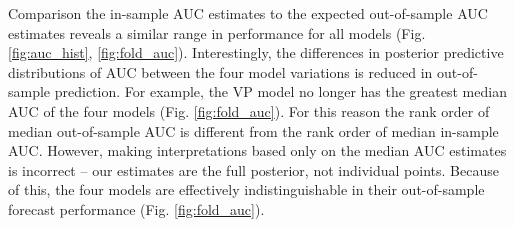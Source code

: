 \documentclass[12pt,letterpaper]{article}
\begin{document}
\begin{refsection}
Comparison the in-sample AUC estimates to the expected out-of-sample AUC estimates reveals a similar range in performance for all models (Fig. \ref{fig:auc_hist}, \ref{fig:fold_auc}). Interestingly, the differences in posterior predictive distributions of AUC between the four model variations is reduced in out-of-sample prediction. For example, the VP model no longer has the greatest median AUC of the four models (Fig. \ref{fig:fold_auc}). For this reason the rank order of median out-of-sample AUC is different from the rank order of median in-sample AUC. However, making interpretations based only on the median AUC estimates is incorrect -- our estimates are the full posterior, not individual points. Because of this, the four models are effectively indistinguishable in their out-of-sample forecast performance (Fig. \ref{fig:fold_auc}).




\end{refsection}
\end{document}

